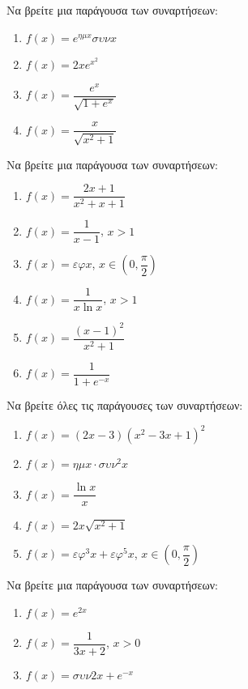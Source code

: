 \documentclass{../presentation}
\begin{document}
\begin{askisi}
  Να βρείτε μια παράγουσα των συναρτήσεων:
  \begin{enumerate}[<+->]
    \item $f(x)=e^{ημx}συνx$
    \item $f(x)=2xe^{x^2}$
    \item $f(x)=\dfrac{e^x}{\sqrt{1+e^x}}$
    \item $f(x)=\dfrac{x}{\sqrt{x^2+1}}$
  \end{enumerate}
\end{askisi}

\begin{askisi}
  Να βρείτε μια παράγουσα των συναρτήσεων:
  \begin{enumerate}[<+->]
    \item $f(x)=\dfrac{2x+1}{x^2+x+1}$
    \item $f(x)=\dfrac{1}{x-1}$, $x>1$
    \item $f(x)=εφx$, $x\in \left( 0,\dfrac{π}{2} \right) $
    \item $f(x)=\dfrac{1}{x\ln x}$, $x>1$
    \item $f(x)=\dfrac{(x-1)^2}{x^2+1}$
    \item $f(x)=\dfrac{1}{1+e^{-x}}$
  \end{enumerate}
\end{askisi}

\begin{askisi}
  Να βρείτε όλες τις παράγουσες των συναρτήσεων:
  \begin{enumerate}[<+->]
    \item $f(x)=(2x-3)(x^2-3x+1)^2$
    \item $f(x)=ημx\cdot συν^2x$
    \item $f(x)=\dfrac{\ln x}{x}$
    \item $f(x)=2x\sqrt{x^2+1}$
    \item $f(x)=εφ^3x+εφ^5x$, $x\in \left( 0,\dfrac{π}{2} \right)$
  \end{enumerate}
\end{askisi}

\begin{askisi}
  Να βρείτε μια παράγουσα των συναρτήσεων:
  \begin{enumerate}[<+->]
    \item $f(x)=e^{2x}$
    \item $f(x)=\dfrac{1}{3x+2}$, $x>0$
    \item $f(x)=συν2x+e^{-x}$
  \end{enumerate}
\end{askisi}
\end{document}
